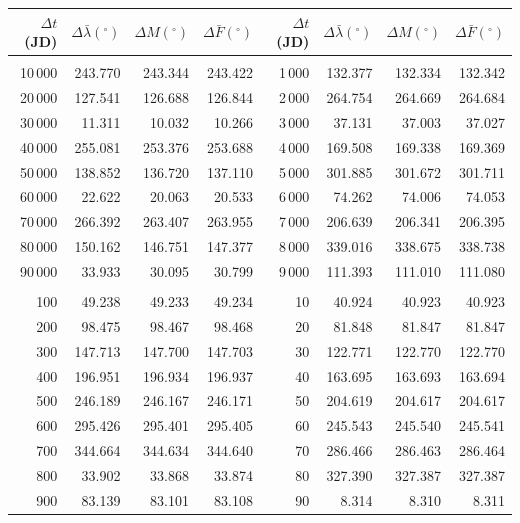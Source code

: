 \clearpage
\begin{table}[!h]
\vspace{0.25cm}
\centering
\begin{tabular}{rrrr|rrrr}
$\Delta t$(JD)& $\Delta\bar{\lambda}(^\circ)$ &  $\Delta M(^\circ)$ & $\Delta \bar{F}(^\circ)$& $\Delta t$(JD) & $\Delta\bar{\lambda}(^\circ)$ & $\Delta M(^\circ)$ 
&$\Delta \bar{F}(^\circ)$\\ \hline
&&&&&&&\\[-1.75ex]
10\,000 & 243.770 & 243.344 & 243.422 & 1\,000 & 132.377 & 132.334 & 132.342\\
20\,000 & 127.541 & 126.688 & 126.844 & 2\,000 & 264.754 & 264.669 & 264.684\\
30\,000 &  11.311 &  10.032 &  10.266 & 3\,000 &  37.131 &  37.003 &  37.027\\
40\,000 & 255.081 & 253.376 & 253.688 & 4\,000 & 169.508 & 169.338 & 169.369\\
50\,000 & 138.852 & 136.720 & 137.110 & 5\,000 & 301.885 & 301.672 & 301.711\\
60\,000 &  22.622 &  20.063 &  20.533 & 6\,000 &  74.262 &  74.006 &  74.053\\
70\,000 & 266.392 & 263.407 & 263.955 & 7\,000 & 206.639 & 206.341 & 206.395\\
80\,000 & 150.162 & 146.751 & 147.377 & 8\,000 & 339.016 & 338.675 & 338.738\\
90\,000 &  33.933 &  30.095 &  30.799 & 9\,000 & 111.393 & 111.010 & 111.080\\
&&&&&&&\\
100 &  49.238 &  49.233 &  49.234 & 10 &  40.924 &  40.923 &  40.923\\
200 &  98.475 &  98.467 &  98.468 & 20 &  81.848 &  81.847 &  81.847\\
300 & 147.713 & 147.700 & 147.703 & 30 & 122.771 & 122.770 & 122.770\\
400 & 196.951 & 196.934 & 196.937 & 40 & 163.695 & 163.693 & 163.694\\
500 & 246.189 & 246.167 & 246.171 & 50 & 204.619 & 204.617 & 204.617\\
600 & 295.426 & 295.401 & 295.405 & 60 & 245.543 & 245.540 & 245.541\\
700 & 344.664 & 344.634 & 344.640 & 70 & 286.466 & 286.463 & 286.464\\
800 &  33.902 &  33.868 &  33.874 & 80 & 327.390 & 327.387 & 327.387\\
900 &  83.139 &  83.101 &  83.108 & 90 &   8.314 &   8.310 &   8.311\\

\end{tabular}
\end{table}
